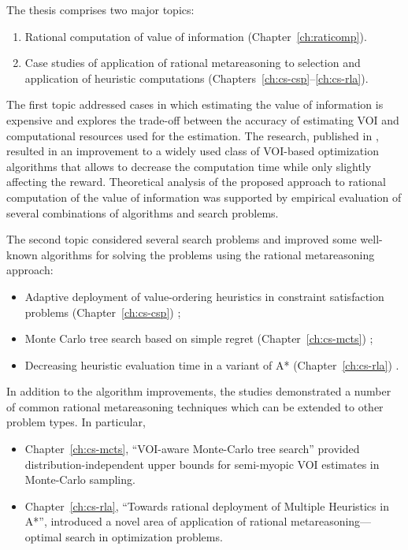 The thesis comprises two major topics:
\begin {enumerate}
\item Rational computation of value of information (Chapter~\ref{ch:raticomp}).
\item Case studies of application of rational metareasoning to
  selection and application of heuristic computations (Chapters~\ref{ch:cs-csp}--\ref{ch:cs-rla}).
\end {enumerate}

The first topic addressed cases in which estimating the value of
information is expensive and explores the trade-off between the
accuracy of estimating VOI and computational resources used for the
estimation. The research, published in \cite{TolpinShimony.raticomp},
resulted in an improvement to a widely used class of VOI-based
optimization algorithms that allows to decrease the computation time
while only slightly affecting the reward. Theoretical analysis of the
proposed approach to rational computation of the value of information
was supported by empirical evaluation of several combinations of
algorithms and search problems.

The second topic considered several search problems and improved some
well-known algorithms for solving the problems using the rational
metareasoning approach:
\begin {itemize}
\item Adaptive deployment of value-ordering heuristics in constraint
  satisfaction problems (Chapter~\ref{ch:cs-csp}) \cite{TolpinShimony.csp};
\item Monte Carlo tree search based on simple regret
  (Chapter~\ref{ch:cs-mcts}) \cite{TolpinShimony.mcts,HayRussellTolpinShimony.selecting};
\item Decreasing heuristic evaluation time in a variant of A*
  (Chapter~\ref{ch:cs-rla}) \cite{TolpinEtAl.rla}. 
\end {itemize}
In addition to the algorithm improvements, the studies demonstrated a
number of common rational metareasoning techniques which can be 
extended to other problem types. In particular,
\begin{itemize}
\item Chapter~\ref{ch:cs-mcts}, ``VOI-aware Monte-Carlo tree search''
provided distribution-independent upper bounds for semi-myopic VOI
estimates in Monte-Carlo sampling.
\item Chapter~\ref{ch:cs-rla}, ``Towards rational deployment of Multiple
Heuristics in A*'', introduced a novel area of application of rational
metareasoning---optimal search in optimization problems.
\end{itemize}

